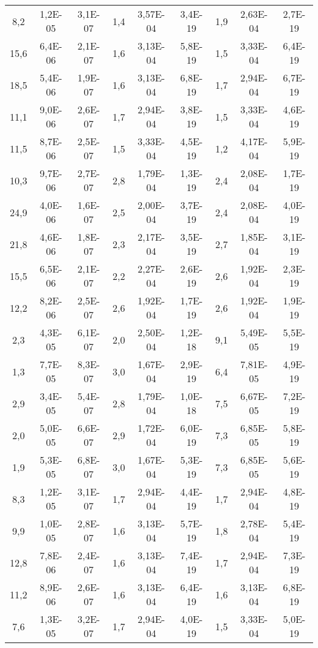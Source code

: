 \begin{longtable}{c c c| c c c |c c c}
        8,2 & 1,2E-05 & 3,1E-07 & 1,4 & 3,57E-04 & 3,4E-19 & 1,9 & 2,63E-04 & 2,7E-19 \\ 
        15,6 & 6,4E-06 & 2,1E-07 & 1,6 & 3,13E-04 & 5,8E-19 & 1,5 & 3,33E-04 & 6,4E-19 \\ 
        18,5 & 5,4E-06 & 1,9E-07 & 1,6 & 3,13E-04 & 6,8E-19 & 1,7 & 2,94E-04 & 6,7E-19 \\ 
        11,1 & 9,0E-06 & 2,6E-07 & 1,7 & 2,94E-04 & 3,8E-19 & 1,5 & 3,33E-04 & 4,6E-19 \\ 
        11,5 & 8,7E-06 & 2,5E-07 & 1,5 & 3,33E-04 & 4,5E-19 & 1,2 & 4,17E-04 & 5,9E-19 \\ 
        \midrule
    
        10,3 & 9,7E-06 & 2,7E-07 & 2,8 & 1,79E-04 & 1,3E-19 & 2,4 & 2,08E-04 & 1,7E-19 \\ 
        24,9 & 4,0E-06 & 1,6E-07 & 2,5 & 2,00E-04 & 3,7E-19 & 2,4 & 2,08E-04 & 4,0E-19 \\ 
        21,8 & 4,6E-06 & 1,8E-07 & 2,3 & 2,17E-04 & 3,5E-19 & 2,7 & 1,85E-04 & 3,1E-19 \\ 
        15,5 & 6,5E-06 & 2,1E-07 & 2,2 & 2,27E-04 & 2,6E-19 & 2,6 & 1,92E-04 & 2,3E-19 \\ 
        12,2 & 8,2E-06 & 2,5E-07 & 2,6 & 1,92E-04 & 1,7E-19 & 2,6 & 1,92E-04 & 1,9E-19 \\  
        \midrule
    
        2,3 & 4,3E-05 & 6,1E-07 & 2,0 & 2,50E-04 & 1,2E-18 & 9,1 & 5,49E-05 & 5,5E-19 \\ 
        1,3 & 7,7E-05 & 8,3E-07 & 3,0 & 1,67E-04 & 2,9E-19 & 6,4 & 7,81E-05 & 4,9E-19 \\ 
        2,9 & 3,4E-05 & 5,4E-07 & 2,8 & 1,79E-04 & 1,0E-18 & 7,5 & 6,67E-05 & 7,2E-19 \\ 
        2,0 & 5,0E-05 & 6,6E-07 & 2,9 & 1,72E-04 & 6,0E-19 & 7,3 & 6,85E-05 & 5,8E-19 \\ 
        1,9 & 5,3E-05 & 6,8E-07 & 3,0 & 1,67E-04 & 5,3E-19 & 7,3 & 6,85E-05 & 5,6E-19 \\ 
        \midrule
    
        8,3 & 1,2E-05 & 3,1E-07 & 1,7 & 2,94E-04 & 4,4E-19 & 1,7 & 2,94E-04 & 4,8E-19 \\ 
        9,9 & 1,0E-05 & 2,8E-07 & 1,6 & 3,13E-04 & 5,7E-19 & 1,8 & 2,78E-04 & 5,4E-19 \\ 
        12,8 & 7,8E-06 & 2,4E-07 & 1,6 & 3,13E-04 & 7,4E-19 & 1,7 & 2,94E-04 & 7,3E-19 \\ 
        11,2 & 8,9E-06 & 2,6E-07 & 1,6 & 3,13E-04 & 6,4E-19 & 1,6 & 3,13E-04 & 6,8E-19 \\ 
        7,6 & 1,3E-05 & 3,2E-07 & 1,7 & 2,94E-04 & 4,0E-19 & 1,5 & 3,33E-04 & 5,0E-19 \\ 
        \bottomrule
        
        
    \end{longtable}
    
    